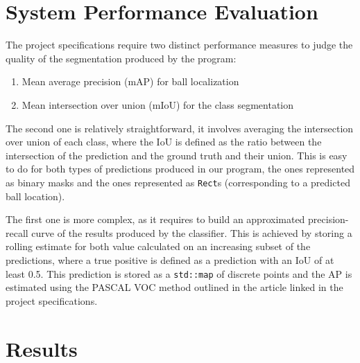 \section{System Performance Evaluation}

The project specifications require two distinct performance 
measures to judge the quality of the segmentation produced 
by the program:

\begin{enumerate}
    \item Mean average precision (mAP) for ball localization
    \item Mean intersection over union (mIoU) for the class segmentation
\end{enumerate}

The second one is relatively straightforward, it involves 
averaging the intersection over union of each class, where 
the IoU is defined as the ratio between the intersection 
of the prediction and the ground truth and their union.
This is easy to do for both types of predictions produced in 
our program, the ones represented as binary masks and the 
ones represented as \verb|Rect|s (corresponding to a predicted 
ball location).

The first one is more complex, as it requires to build an 
approximated precision-recall curve of the results produced 
by the classifier. This is achieved by storing a rolling 
estimate for both value calculated on an increasing subset 
of the predictions, where a true positive is defined as 
a prediction with an IoU of at least 0.5.
This prediction is stored as a \verb|std::map| of discrete 
points and the AP is estimated using the PASCAL VOC method 
outlined in the article linked in the project specifications.


\vspace{16cm}
\section{Results}
